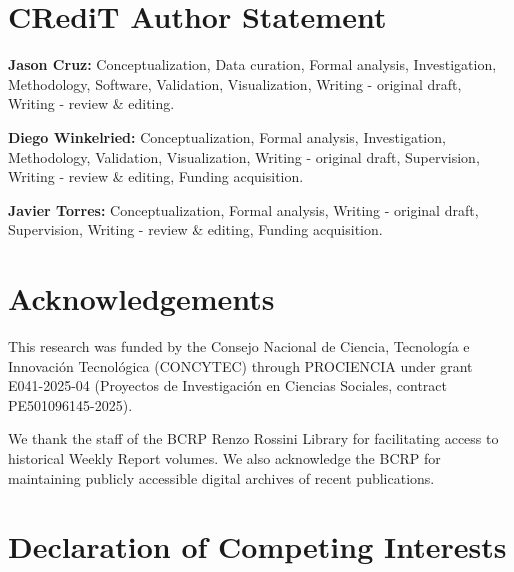 \documentclass[12pt]{article}
\begin{document}
\section*{CRediT Author Statement}


\textbf{Jason Cruz:} Conceptualization, Data curation, Formal analysis, Investigation, Methodology, Software, Validation, Visualization, Writing - original draft, Writing - review \& editing.

\textbf{Diego Winkelried:} Conceptualization, Formal analysis, Investigation, Methodology, Validation, Visualization, Writing - original draft, Supervision, Writing - review \& editing, Funding acquisition.

\textbf{Javier Torres:} Conceptualization, Formal analysis, Writing - original draft, Supervision, Writing - review \& editing, Funding acquisition.

\section*{Acknowledgements}


This research was funded by the Consejo Nacional de Ciencia, Tecnología e Innovación Tecnológica (CONCYTEC) through PROCIENCIA under grant E041-2025-04 (Proyectos de Investigación en Ciencias Sociales, contract PE501096145-2025).

We thank the staff of the BCRP Renzo Rossini Library for facilitating access to historical Weekly Report volumes. We also acknowledge the BCRP for maintaining publicly accessible digital archives of recent publications.

\section*{Declaration of Competing Interests}
\end{document}
